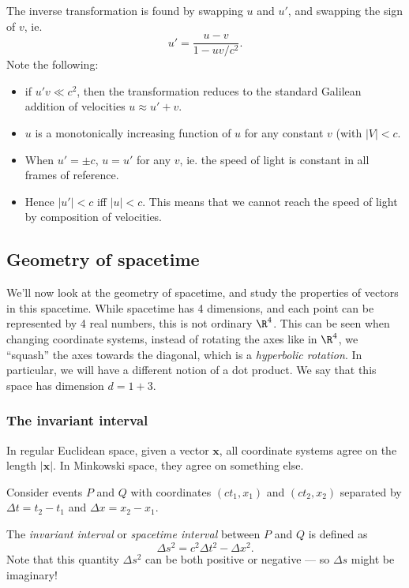 \documentclass[a4paper]{article}
\begin{document}
The inverse transformation is found by swapping $u$ and $u'$, and swapping the sign of $v$, ie.
\[
  u' = \frac{u - v}{1 - uv/c^2}.
\]
Note the following:
\begin{itemize}
  \item if $u'v \ll c^2$, then the transformation reduces to the standard Galilean addition of velocities $u \approx u' + v$.
  \item $u$ is a monotonically increasing function of $u$ for any constant $v$ (with $|V| < c$.
  \item When $u' = \pm c$, $u = u'$ for any $v$, ie. the speed of light is constant in all frames of reference.
  \item Hence $|u'| < c$ iff $|u| < c$. This means that we cannot reach the speed of light by composition of velocities.
\end{itemize}

\subsection{Geometry of spacetime}
We'll now look at the geometry of spacetime, and study the properties of vectors in this spacetime. While spacetime has 4 dimensions, and each point can be represented by 4 real numbers, this is not ordinary $\R^4$. This can be seen when changing coordinate systems, instead of rotating the axes like in $\R^4$, we ``squash'' the axes towards the diagonal, which is a \emph{hyperbolic rotation}. In particular, we will have a different notion of a dot product. We say that this space has dimension $d = 1 + 3$.

\subsubsection*{The invariant interval}
In regular Euclidean space, given a vector $\mathbf{x}$, all coordinate systems agree on the length $|\mathbf{x}|$. In Minkowski space, they agree on something else.

Consider events $P$ and $Q$ with coordinates $(ct_1, x_1)$ and $(ct_2, x_2)$ separated by $\Delta t = t_2 - t_1$ and $\Delta x = x_2 - x_1$.

\begin{defi}
  The \emph{invariant interval} or \emph{spacetime interval} between $P$ and $Q$ is defined as
  \[
    \Delta s^2 = c^2 \Delta t^2 - \Delta x^2.
  \]
  Note that this quantity $\Delta s^2$ can be both positive or negative --- so $\Delta s$ might be imaginary!
\end{defi}
\end{document}
